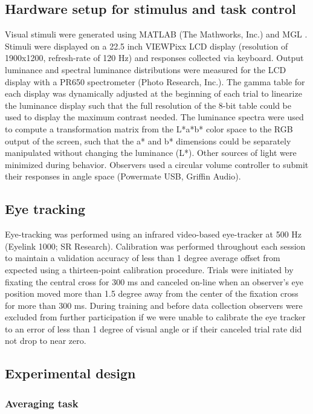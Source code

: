 \subsection{Hardware setup for stimulus and task control}

Visual stimuli were generated using MATLAB (The Mathworks, Inc.) and MGL \citep{Gardner2018-uq}. Stimuli were displayed on a 22.5 inch VIEWPixx LCD display (resolution of 1900x1200, refresh-rate of 120 Hz) and responses collected via keyboard. Output luminance and spectral luminance distributions were measured for the LCD display with a PR650 spectrometer (Photo Research, Inc.). The gamma table for each display was dynamically adjusted at the beginning of each trial to linearize the luminance display such that the full resolution of the 8-bit table could be used to display the maximum contrast needed. The luminance spectra were used to compute a transformation matrix from the L*a*b* color space to the RGB output of the screen, such that the a* and b* dimensions could be separately manipulated without changing the luminance (L*). Other sources of light were minimized during behavior. Observers used a circular volume controller to submit their responses in angle space (Powermate USB, Griffin Audio).

\subsection{Eye tracking}

Eye-tracking was performed using an infrared video-based eye-tracker at 500 Hz (Eyelink 1000; SR Research). Calibration was performed throughout each session to maintain a validation accuracy of less than 1 degree average offset from expected using a thirteen-point calibration procedure. Trials were initiated by fixating the central cross for 300 ms and canceled on-line when an observer’s eye position moved more than 1.5 degree away from the center of the fixation cross for more than 300 ms. During training and before data collection observers were excluded from further participation if we were unable to calibrate the eye tracker to an error of less than 1 degree of visual angle or if their canceled trial rate did not drop to near zero.

\subsection{Experimental design}

\subsubsection{Averaging task}

